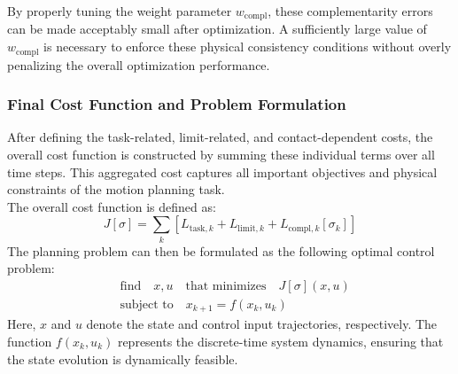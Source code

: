 \documentclass[main.tex]{subfiles}
\begin{document}
By properly tuning the weight parameter $w_{\text{compl}}$, these complementarity errors can be made acceptably small after optimization. A sufficiently large value of $w_{\text{compl}}$ is necessary to enforce these physical consistency conditions without overly penalizing the overall optimization performance.
\subsubsection{Final Cost Function and Problem Formulation}
After defining the task-related, limit-related, and contact-dependent costs, the overall cost function is constructed by summing these individual terms over all time steps. This aggregated cost captures all important objectives and physical constraints of the motion planning task.
\\
The overall cost function is defined as:
\begin{equation}
J[\sigma] = \sum_k \left[ L_{\text{task},k} + L_{\text{limit},k} + L_{\text{compl},k}[\sigma_k] \right]
\end{equation}
The planning problem can then be formulated as the following optimal control problem:
\begin{equation}
\begin{aligned}
& \text{find} \quad x, u \quad \text{that minimizes} \quad J[\sigma](x,u) \\
& \text{subject to} \quad x_{k+1} = f(x_k, u_k)
\end{aligned}
\end{equation}
Here, $x$ and $u$ denote the state and control input trajectories, respectively. The function $f(x_k, u_k)$ represents the discrete-time system dynamics, ensuring that the state evolution is dynamically feasible.
\begin{comment}
This problem is formulated using a \textit{single shooting} approach, where the control inputs are directly optimized and the states are obtained by integrating the system dynamics forward in time. 
Due to the nonlinearities in the cost terms (especially those involving contact forces and constraints) and the system dynamics, the resulting optimization is generally a \textit{nonlinear programming problem} (NLP). However, in certain cases where the dynamics and cost functions are affine and the constraints are quadratic, the problem structure could be approximated as a \textit{quadratic programming} (QP) problem to enable faster computation.
Overall, the optimization simultaneously enforces task tracking, physical feasibility, and complementarity conditions related to contact interactions throughout the planned motion.
\end{comment}
\end{document}
